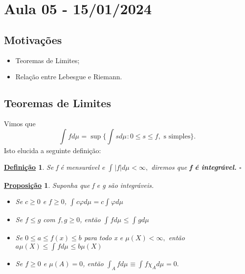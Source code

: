 \documentclass{article}
\newtheorem*{def*}{\underline{Defini\c c\~ao}}
\newtheorem*{prop*}{\underline{Proposi\c c\~ao}}
\begin{document}
\section{Aula 05 - 15/01/2024}
\subsection{Motivações}
\begin{itemize}
  \item Teoremas de Limites; 
  \item Relação entre Lebesgue e Riemann.
\end{itemize}
\subsection{Teoremas de Limites} 
  Vimos que 
    \[
      \int_{}f d\mu_{} = \sup_{}\biggl\{\int_{}s d\mu_{}: 0 \leq s\leq f, \text{ s simples}\biggr\}.
    \]
  Isto elucida a seguinte definição: 
 \begin{def*}
   Se f é mensurável e \(\int_{}|f| d\mu_{} < \infty,\) diremos que \textbf{f é integrável.} \(\square\)
 \end{def*}
\begin{prop*}
  Suponha que f e g são integráveis. 
 \begin{itemize}
   \item[a)] Se \(c \geq 0\) e \(f\geq 0\), \(\int_{}c\varphi  d\mu_{} = c \int_{}\varphi d\mu_{}\)
     \item[b)] Se \(f\leq g\) com \(f, g \geq 0\), então \(\int_{}f d\mu_{} \leq \int_{}g d\mu_{}\)
       \item[c)] Se \(0\leq a\leq f(x)\leq b\) para todo x e \(\mu (X) < \infty,\) então \(a\mu (X) \leq \int_{}f d\mu_{} \leq b\mu (X)\)
         \item[d)] Se \(f\geq 0\) e \(\mu (A) = 0\), então \(\int_{A}f d\mu_{}\equiv \int_{}f \chi_{A} d\mu_{} = 0.\)
 \end{itemize}
\end{prop*}
\end{document}
